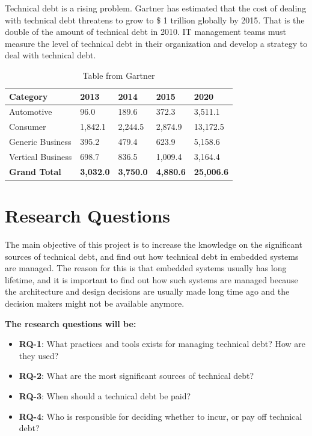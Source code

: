 Technical debt is a rising problem. Gartner has estimated that the cost of dealing with technical debt threatens to grow to \$ 1 trillion globally by 2015\cite{gartner2010}. That is the double of the amount of technical debt in 2010. IT management teams must measure the level of technical debt in their organization and develop a strategy to deal with technical debt.

\begin{table}[H]
	\centering
	\begin{tabular}{ | l | l | l | l | l |}
	\hline
	\textbf{Category} & \textbf{2013} & \textbf{2014} & \textbf{2015} & \textbf{2020} \\ \hline
	Automotive & 96.0 & 189.6 & 372.3 & 3,511.1 \\ \hline
	Consumer & 1,842.1 & 2,244.5 & 2,874.9 & 13,172.5 \\ \hline
	Generic Business & 395.2 & 479.4 & 623.9 & 5,158.6 \\ \hline
	Vertical Business & 698.7 & 836.5 & 1,009.4 & 3,164.4 \\ \hline
	\textbf{Grand Total} & \textbf{3,032.0} & \textbf{3,750.0} & \textbf{4,880.6} & \textbf{25,006.6} \\
	\hline
	\end{tabular}
	\caption{Table from Gartner\cite{gartner}} \label{tab:table1}
\end{table}


\section{Research Questions}
The main objective of this project is to increase the knowledge on the significant sources of technical debt, and find out how technical debt in embedded systems are managed. The reason for this is that embedded systems usually has long lifetime, and it is important to find out how such systems are managed because the architecture and design decisions are usually made long time ago and the decision makers might not be available anymore. 

\textbf{The research questions will be:} 
\begin{itemize}
	\item \textbf{RQ-1}: What practices and tools exists for managing technical debt? How are they used?
	\item \textbf{RQ-2}: What are the most significant sources of technical debt?
	\item \textbf{RQ-3}: When should a technical debt be paid?
	\item \textbf{RQ-4}: Who is responsible for deciding whether to incur, or pay off technical debt?
\end{itemize}

